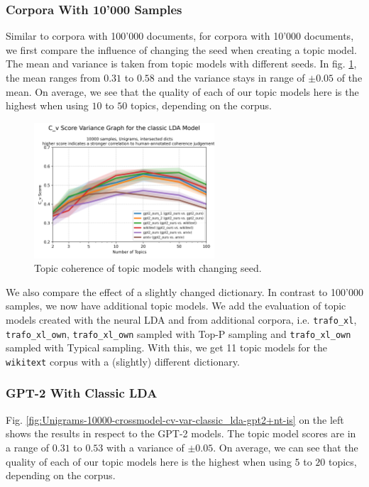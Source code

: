 \subsubsection{Corpora With 10'000 Samples}
Similar to corpora with 100'000 documents, for corpora with 10'000 documents, we first compare the influence of changing the seed when creating a topic model. The mean and variance is taken from topic models with different seeds. In fig. \ref{fig:Unigrams-10000-var-cv-is}, the mean ranges from $0.31$ to $0.58$ and the variance stays in range of $\pm0.05$ of the mean. On average, we see that the quality of each of our topic models here is the highest when using $10$ to $50$ topics, depending on the corpus. 
\begin{figure}[H]
    \centering
    \includegraphics[width=0.6\textwidth]{figures/Unigrams-10000-var-cv-is}
    \caption{Topic coherence of topic models with changing seed.}
    \label{fig:Unigrams-10000-var-cv-is}
\end{figure}
We also compare the effect of a slightly changed dictionary. In contrast to 100'000 samples, we now have additional topic models. We add the evaluation of topic models created with the neural LDA and from additional corpora, i.e. \texttt{trafo\_xl}, \texttt{trafo\_xl\_own}, \texttt{trafo\_xl\_own} sampled with Top-P sampling and \texttt{trafo\_xl\_own} sampled with Typical sampling. With this, we get 11 topic models for the \texttt{wikitext} corpus with a (slightly) different dictionary. 

\subsubsection{GPT-2 With Classic LDA}
Fig. \ref{fig:Unigrams-10000-crossmodel-cv-var-classic_lda-gpt2+nt-is} on the left shows the results in respect to the GPT-2 models. The topic model scores are in a range of $0.31$ to $0.53$ with a variance of $\pm0.05$. On average, we can see that the quality of each of our topic models here is the highest when using $5$ to $20$ topics, depending on the corpus.


